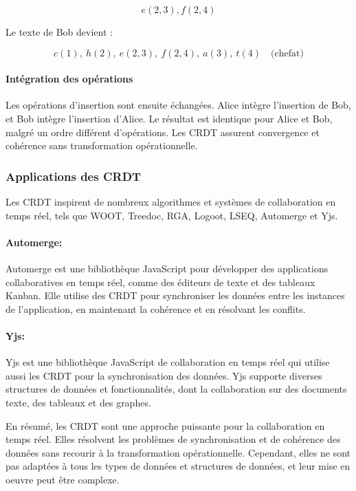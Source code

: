 \begin{equation}
    e(2, 3), f(2, 4)
\end{equation}

Le texte de Bob devient :

\begin{equation}
    c(1), \ h(2), \ e(2, 3), \ f(2, 4), \ a(3), \ t(4) \quad \text{(chefat)}
\end{equation}

\paragraph{Intégration des opérations}
Les opérations d'insertion sont ensuite échangées. Alice intègre l'insertion de Bob, et Bob intègre l'insertion d'Alice. Le résultat est identique pour Alice et Bob, malgré un ordre différent d'opérations. Les CRDT assurent convergence et cohérence sans transformation opérationnelle.

\subsubsection{Applications des \Gls{CRDT}}
Les \Gls{CRDT} inspirent de nombreux algorithmes et systèmes de collaboration en temps réel, tels que WOOT, Treedoc, RGA, Logoot, LSEQ, Automerge et Yjs.

\paragraph{Automerge\cite{hardenbergAutomerge2023}: } Automerge est une bibliothèque JavaScript pour développer des applications collaboratives en temps réel, comme des éditeurs de texte et des tableaux Kanban. Elle utilise des \Gls{CRDT} pour synchroniser les données entre les instances de l'application, en maintenant la cohérence et en résolvant les conflits.

\paragraph{Yjs\cite{nicolaescuYjsFrameworkRealTime2015}: } Yjs est une bibliothèque JavaScript de collaboration en temps réel qui utilise aussi les \Gls{CRDT} pour la synchronisation des données. Yjs supporte diverses structures de données et fonctionnalités, dont la collaboration sur des documents texte, des tableaux et des graphes.

En résumé, les \Gls{CRDT} sont une approche puissante pour la collaboration en temps réel. Elles résolvent les problèmes de synchronisation et de cohérence des données sans recourir à la transformation opérationnelle. Cependant, elles ne sont pas adaptées à tous les types de données et structures de données, et leur mise en oeuvre peut être complexe.

